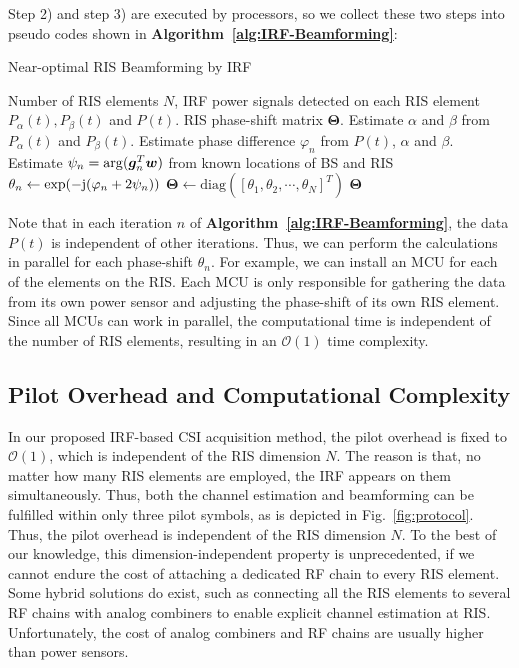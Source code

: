 \documentclass[journal,twocolumn]{IEEEtran}
\theoremstyle{nonumberplain}
\def \diag {\text{diag}}
\def \exp {\text{exp}}
\begin{document}
    Step 2) and step 3) are executed by processors, so we collect these two steps into pseudo codes shown in {\bf Algorithm~\ref{alg:IRF-Beamforming}}:
    \begin{algorithm}[t] 
        \caption{Near-optimal RIS Beamforming by IRF} \label{alg:IRF-Beamforming}
        \begin{algorithmic}[1]
            \REQUIRE Number of RIS elements $N$, IRF power signals detected on each RIS element $P_{\alpha}(t), P_{\beta}(t)$ and $P(t)$.
            \ENSURE RIS phase-shift matrix ${\bm \Theta}$.
                \STATE Estimate $\alpha$ and $\beta$ from $P_{\alpha}(t)$ and $P_{\beta}(t)$.
                \STATE Estimate phase difference $\varphi_n$ from $P(t)$, $\alpha$ and $\beta$. 
                \STATE Estimate $\psi_{n} = {\rm arg}(\bm g_{n}^{T}\bm w)$ from known locations of BS and RIS
                \STATE $\theta_n \leftarrow \exp(-{\rm j}(\varphi_n + 2\psi_n))$
            \ENDFOR
            \STATE ${\bm \Theta} \leftarrow \diag\left(\left[\theta_1, \theta_2, \cdots, \theta_N\right]^{T}\right)$
            \RETURN ${\bm \Theta}$
        \end{algorithmic}
    \end{algorithm}
    Note that in each iteration $n$ of {\bf Algorithm~\ref{alg:IRF-Beamforming}}, the data $P(t)$ is independent of other iterations. Thus, we can perform the calculations in parallel for each phase-shift $\theta_n$. For example, we can install an MCU for each of the elements on the RIS. Each MCU is only responsible for gathering the data from its own power sensor and adjusting the phase-shift of its own RIS element. Since all MCUs can work in parallel, the computational time is independent of the number of RIS elements, resulting in an $\mathcal{O}(1)$ time complexity. 

\subsection{Pilot Overhead and Computational Complexity}\label{Pilot Overhead}
    In our proposed IRF-based CSI acquisition method, the pilot overhead is fixed to $\mathcal{O}(1)$, which is independent of the RIS dimension $N$. 
    The reason is that, no matter how many RIS elements are employed, the IRF appears on them simultaneously. 
    Thus, both the channel estimation and beamforming can be fulfilled within only three pilot symbols, as is depicted in Fig.~\ref{fig:protocol}. 
    Thus, the pilot overhead is independent of the RIS dimension $N$. 
    To the best of our knowledge, this dimension-independent property is unprecedented, if we cannot endure the cost of attaching a dedicated RF chain to every RIS element. Some hybrid solutions do exist, such as connecting all the RIS elements to several RF chains with analog combiners\cite{alexandropoulos2021hybrid,alexandropoulos2020hardware} to enable explicit channel estimation at RIS. Unfortunately, the cost of analog combiners and RF chains are usually higher than power sensors.
    
\end{document}
